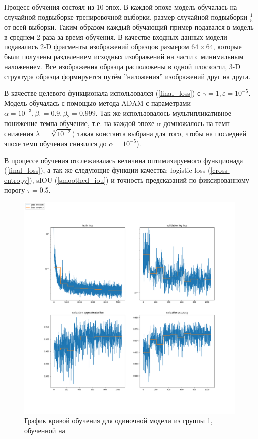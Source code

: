 \documentclass[14pt, a4paper, oneside, bold]{extarticle}
\begin{document}
Процесс обучения состоял из 10 эпох. В каждой эпохе модель обучалась на случайной подвыборке тренировочной выборки, размер случайной подвыборки $\frac{1}{5}$ от всей выборки. Таким образом каждый обучающий пример подавался в модель в среднем 2 раза за время обучения. В качестве входных данных модели подавались 2-D фрагменты изображений образцов размером $64 \times 64$, которые были получены разделением исходных изображений на части с минимальным наложением.
Все изображения образца расположены в одной плоскости, 3-D структура образца формируется путём ''наложения'' изображений друг на друга.

В качестве целевого функционала использовался (\ref{final_loss}) с 
$\gamma=1, \varepsilon=10^{-5}$. Модель обучалась с помощью метода 
ADAM \cite{19} с параметрами \\
$\alpha=10^{-3}, \beta_1=0.9, \beta_2=0.999$. Так же использовалось 
мультипликативное понижение темпа обучение, т.е. на каждой эпохе 
$\alpha$ домножалось на темп снижения $\lambda=\sqrt[10]{10^{-2}}$( такая константа выбрана для того, чтобы на последней эпохе темп обучения снизился до $\alpha=10^{-5}$).

В процессе обучения отслеживалась величина оптимизируемого функционада (\ref{final_loss}), а так же следующие функции качества:
logistic loss (\ref{cross-entropy}), sIOU (\ref{smoothed_iou}) и 
точность предсказаний по фиксированному порогу $\tau=0.5$. 

\begin{figure}[h!] \label{learning_1}
\includegraphics[width=0.99\textwidth]{data/images/learning_progress_SoilB-2.png}
\caption{График кривой обучения для одиночной модели из группы 1, обученной на }
\end{figure}
\end{document}
